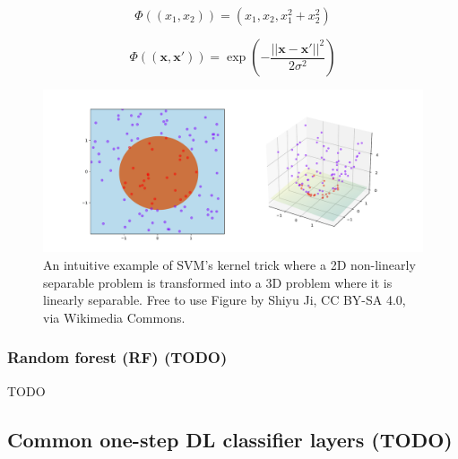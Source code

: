 \begin{equation}
    \label{eq:processing_signals_svm_kernel_function}
    \Phi ((x_1, x_2)) = (x_1, x_2, x_1^2 + x_2^2)
\end{equation}

\begin{equation}
    \label{eq:processing_signals_svm_rbf}
    \Phi ((\mathbf{x}, \mathbf{x}')) = \exp(- \frac{|| \mathbf{x} - \mathbf{x}' ||^2}{2 \sigma^2} )
\end{equation}

\begin{figure}[t]
    \centering
    \includegraphics[width=\linewidth]{../images/pipeline/svm_kernel_trick.pdf}
    \captionsetup{width=0.8\linewidth}
    \captionsetup{justification=centering}
    \caption{An intuitive example of SVM's kernel trick where a 2D non-linearly separable problem is transformed into a 3D problem where it is linearly separable. Free to use Figure by Shiyu Ji, CC BY-SA 4.0, via Wikimedia Commons.}
    \label{fig:processing_signals_svm_kernel}
\end{figure}


\subsubsection{Random forest (RF) (TODO)}
\label{subsubsec:processing_signals_ml_and_dl_ml_classifiers_rf}


TODO 



\subsection{Common one-step DL classifier layers (TODO)}
\label{subsec:processing_signals_ml_and_dl_dl_classifiers}

